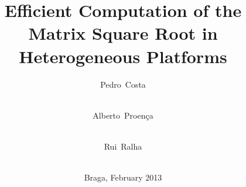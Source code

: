 
\titlehead{%
University~of~Minho%
\hfill%
Informatics~Department%
}

\subject{Dissertation for Master's Degree in Informatics Engineering}

\author{%
Pedro~Costa\\\student\\%
\and Alberto~Proença\\\advisor\\%
\and Rui~Ralha\\\coadvisor\\%
}

\title{Efficient Computation of the Matrix Square Root in Heterogeneous Platforms}

\date{Braga, February 2013}
